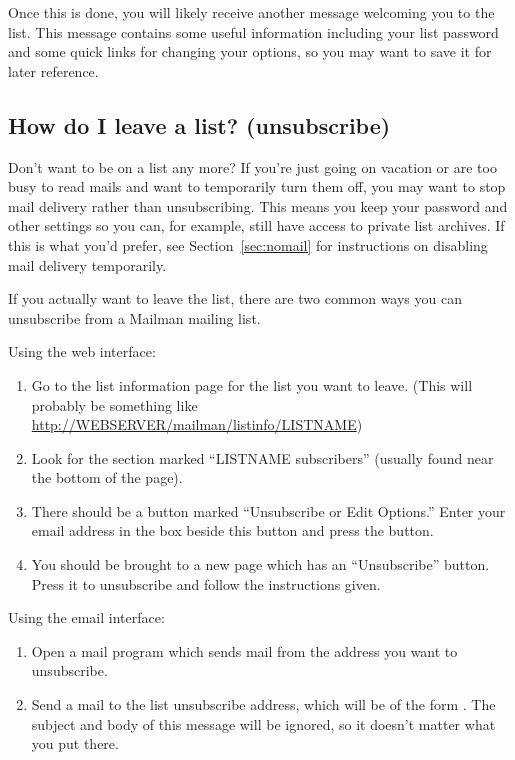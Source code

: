 \documentclass{howto}
\begin{document}
Once this is done, you will likely receive another message welcoming you to
the list.  This message contains some useful information including your list
password and some quick links for changing your options, so you may want to
save it for later reference.


\subsection{How do I leave a list? (unsubscribe)\label{sec:unsubscribe}}

Don't want to be on a list any more?  If you're just going on vacation or
are too busy to read mails and want to temporarily turn them off, you may want
to stop mail delivery rather than unsubscribing.  This means you keep your
password and other settings so you can, for example, still have access to 
private list archives.  If this is what you'd
prefer, see Section~\ref{sec:nomail} for instructions on disabling mail
delivery temporarily.

If you actually want to leave the list, there are two common ways you can
unsubscribe from a Mailman mailing list.

Using the web interface:
\begin{enumerate}
	\item Go to the list information page for the list you want to leave.
	(This will probably be something like 
	\url{http://WEBSERVER/mailman/listinfo/LISTNAME})
	\item Look for the section marked ``LISTNAME subscribers'' (usually found 
	near the bottom of the page).
	\item There should be a button marked ``Unsubscribe or Edit Options.''  
	Enter your email address in the box beside this button and press the
	button.
	\item You should be brought to a new page which has an ``Unsubscribe''
	button.  Press it to unsubscribe and follow the instructions given.
\end{enumerate}

Using the email interface:
\begin{enumerate}
	\item Open a mail program which sends mail from the address you want to 
	unsubscribe.
	\item Send a mail to the list unsubscribe address, which will be of the form
	.  
	The subject and body
	of this message will be ignored, so it doesn't matter what you put there.
\end{enumerate}
\end{document}
